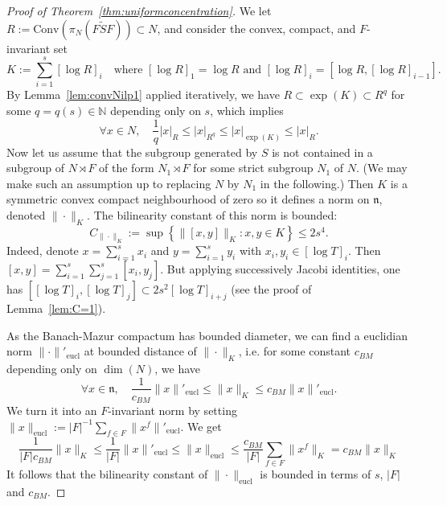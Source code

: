 \documentclass[11pt,leqno]{article}
\theoremstyle{plain}
\theoremstyle{definition}
\theoremstyle{remark}
\numberwithin{equation}{section}
\begin{document}
\begin{proof}[Proof of Theorem~\ref{thm:uniformconcentration}]
We let $R:=\mathrm{Conv}(\pi_N(F\widetilde{S}F))\subset N$, and consider the convex, compact, and $F$-invariant set
\[
K:=\sum_{i=1}^s [\log R]_i \quad \textrm{where }[\log R]_1=\log R \textrm{ and } [\log R]_i=[\log R, [\log R]_{i-1}].
\]
By Lemma~\ref{lem:convNilp1} applied iteratively, we have $R \subset \exp(K) \subset R^q$ for some $q=q(s) \in \mathbb{N}$ depending only on $s$, which implies
\begin{equation}\label{eq:normsRK}
\forall x \in N, \quad \frac{1}{q}|x|_{R} \le |x|_{R^q} \le |x|_{\exp(K)} \le |x|_R.
\end{equation}
Now let us assume that the subgroup generated by $S$ is not contained in a subgroup of $N\rtimes F$ of  the form $N_1\rtimes F$ for some strict subgroup $N_1$ of $N$. (We may make such an assumption up to replacing $N$ by $N_1$ in the following.) Then $K$ is a symmetric convex compact neighbourhood of zero so it defines a norm on $\mathfrak{n}$, denoted $\|\cdot\|_K$. The bilinearity constant of this norm is bounded:
\[
C_{\|\cdot\|_K}:=\sup\left\{ \|[x,y]\|_K:x,y\in K \right\} \le 2s^4.
\]
Indeed, denote $x=\sum_{i=1}^s x_i$ and $y=\sum_{i=1}^s y_i$ with $x_i,y_i \in [\log T]_i$. 
Then $[x,y]=\sum_{i=1}^s\sum_{j=1}^s[x_i,y_j]$. 
But applying successively Jacobi identities, one has $[[\log T]_i,[\log T]_j] \subset 2s^2[\log T]_{i+j}$ (see the proof of Lemma~\ref{lem:C=1}).

As the Banach-Mazur compactum has bounded diameter, we can find a euclidian norm $\|\cdot\|'_{\mathrm{eucl}}$ at bounded distance of $\|\cdot\|_K$, i.e. for some constant $c_{BM}$ depending only on $\dim(N)$, we have
\[
\forall x \in \mathfrak{n}, \quad \frac{1}{c_{BM}}\|x\|'_{\mathrm{eucl}} \le \|x\|_K \le c_{BM}\|x\|'_{\mathrm{eucl}}.
\]
We turn it into an $F$-invariant norm by setting $\|x\|_{\mathrm{eucl}}:=|F|^{-1}\sum_{f\in F}\|x^f\|'_{\mathrm{eucl}}$. We get
\[
\frac{1}{|F|c_{BM}}\|x\|_K \le \frac{1}{|F|}\|x\|'_{\mathrm{eucl}} \le \|x\|_{\mathrm{eucl}} \le \frac{c_{BM}}{|F|}\sum_{f\in F}\|x^f\|_K=c_{BM}\|x\|_K
\]
It follows that the bilinearity constant of $\|\cdot\|_{\mathrm{eucl}}$ is bounded in terms of $s$, $|F|$ and $c_{BM}$.


\end{proof}
\end{document}
